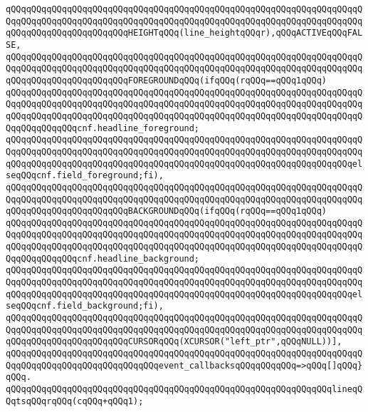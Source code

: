 \verb|qQQqqQQqqQQqqQQqqQQqqQQqqQQqqQQqqQQqqQQqqQQqqQQqqQQqqQQqqQQqqQQqqQQqqQQqqQQqqQQqqQQqqQQqqQQqqQQqqQQqqQQqqQQqqQQqqQQqqQQqqQQqqQQqqQQqqQQqqQQqqQQqqQQqqQQqqQQqqQQqqQQqHEIGHTqQQq(line_heightqQQqr),qQQqACTIVEqQQqFALSE,|\newline
\verb|qQQqqQQqqQQqqQQqqQQqqQQqqQQqqQQqqQQqqQQqqQQqqQQqqQQqqQQqqQQqqQQqqQQqqQQqqQQqqQQqqQQqqQQqqQQqqQQqqQQqqQQqqQQqqQQqqQQqqQQqqQQqqQQqqQQqqQQqqQQqqQQqqQQqqQQqqQQqqQQqqQQqFOREGROUNDqQQq(ifqQQq(rqQQq==qQQq1qQQq)|\newline
\verb|qQQqqQQqqQQqqQQqqQQqqQQqqQQqqQQqqQQqqQQqqQQqqQQqqQQqqQQqqQQqqQQqqQQqqQQqqQQqqQQqqQQqqQQqqQQqqQQqqQQqqQQqqQQqqQQqqQQqqQQqqQQqqQQqqQQqqQQqqQQqqQQqqQQqqQQqqQQqqQQqqQQqqQQqqQQqqQQqqQQqqQQqqQQqqQQqqQQqqQQqqQQqqQQqqQQqqQQqqQQqqQQqcnf.headline_foreground;|\newline
\verb|qQQqqQQqqQQqqQQqqQQqqQQqqQQqqQQqqQQqqQQqqQQqqQQqqQQqqQQqqQQqqQQqqQQqqQQqqQQqqQQqqQQqqQQqqQQqqQQqqQQqqQQqqQQqqQQqqQQqqQQqqQQqqQQqqQQqqQQqqQQqqQQqqQQqqQQqqQQqqQQqqQQqqQQqqQQqqQQqqQQqqQQqqQQqqQQqqQQqqQQqqQQqqQQqelseqQQqcnf.field_foreground;fi),|\newline
\verb|qQQqqQQqqQQqqQQqqQQqqQQqqQQqqQQqqQQqqQQqqQQqqQQqqQQqqQQqqQQqqQQqqQQqqQQqqQQqqQQqqQQqqQQqqQQqqQQqqQQqqQQqqQQqqQQqqQQqqQQqqQQqqQQqqQQqqQQqqQQqqQQqqQQqqQQqqQQqqQQqqQQqBACKGROUNDqQQq(ifqQQq(rqQQq==qQQq1qQQq)|\newline
\verb|qQQqqQQqqQQqqQQqqQQqqQQqqQQqqQQqqQQqqQQqqQQqqQQqqQQqqQQqqQQqqQQqqQQqqQQqqQQqqQQqqQQqqQQqqQQqqQQqqQQqqQQqqQQqqQQqqQQqqQQqqQQqqQQqqQQqqQQqqQQqqQQqqQQqqQQqqQQqqQQqqQQqqQQqqQQqqQQqqQQqqQQqqQQqqQQqqQQqqQQqqQQqqQQqqQQqqQQqqQQqqQQqcnf.headline_background;|\newline
\verb|qQQqqQQqqQQqqQQqqQQqqQQqqQQqqQQqqQQqqQQqqQQqqQQqqQQqqQQqqQQqqQQqqQQqqQQqqQQqqQQqqQQqqQQqqQQqqQQqqQQqqQQqqQQqqQQqqQQqqQQqqQQqqQQqqQQqqQQqqQQqqQQqqQQqqQQqqQQqqQQqqQQqqQQqqQQqqQQqqQQqqQQqqQQqqQQqqQQqqQQqqQQqqQQqelseqQQqcnf.field_background;fi),|\newline
\verb|qQQqqQQqqQQqqQQqqQQqqQQqqQQqqQQqqQQqqQQqqQQqqQQqqQQqqQQqqQQqqQQqqQQqqQQqqQQqqQQqqQQqqQQqqQQqqQQqqQQqqQQqqQQqqQQqqQQqqQQqqQQqqQQqqQQqqQQqqQQqqQQqqQQqqQQqqQQqqQQqqQQqCURSORqQQq(XCURSOR("left_ptr",qQQqNULL))],|\newline
\verb|qQQqqQQqqQQqqQQqqQQqqQQqqQQqqQQqqQQqqQQqqQQqqQQqqQQqqQQqqQQqqQQqqQQqqQQqqQQqqQQqqQQqqQQqqQQqqQQqqQQqevent_callbacksqQQqqQQqqQQq=>qQQq[]qQQq}qQQq.|\newline
\verb|qQQqqQQqqQQqqQQqqQQqqQQqqQQqqQQqqQQqqQQqqQQqqQQqqQQqqQQqqQQqqQQqlineqQQqtsqQQqrqQQq(cqQQq+qQQq1);|\newline
